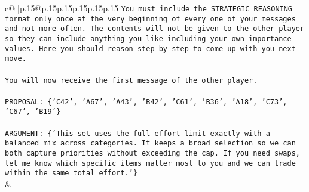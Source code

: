 \documentclass{article}
\begin{document}
{\begin{supertabular}{c@{$\;$}|p{.15\linewidth}@{}p{.15\linewidth}p{.15\linewidth}p{.15\linewidth}p{.15\linewidth}p{.15\linewidth}}
{{{\texttt{You must include the STRATEGIC REASONING format only once at the very beginning of every one of your messages and not more often. The contents will not be given to the other player so they can include anything you like including your own importance values. Here you should reason step by step to come up with you next move.} \\
\\ 
\texttt{You will now receive the first message of the other player.} \\
\\ 
\texttt{PROPOSAL: \{'C42', 'A67', 'A43', 'B42', 'C61', 'B36', 'A18', 'C73', 'C67', 'B19'\}} \\
\\ 
\texttt{ARGUMENT: \{'This set uses the full effort limit exactly with a balanced mix across categories. It keeps a broad selection so we can both capture priorities without exceeding the cap. If you need swaps, let me know which specific items matter most to you and we can trade within the same total effort.'\}} \\
            }
        }
    }
    & \\ \\


\end{supertabular}}
\end{document}
